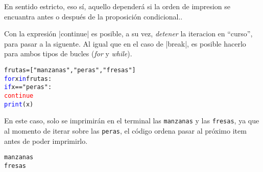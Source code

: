 \documentclass{article}
\begin{document}
\begin{enumerate}
{  En sentido estricto, eso sí, aquello dependerá si la orden de impresion se encuantra antes o después de la proposición condicional.}.
\par \hspace{5pt} Con la expresión \rverb|continue| es posible, a su vez, \emph{detener} la iteracion en ``curso'', para pasar a la siguente. Al igual que en el caso de \rverb|break|, es posible hacerlo para ambos tipos de bucles (\emph{for} y \emph{while}).
\begin{tcolorbox}
\begin{alltt}
frutas = ["manzanas", "peras", "fresas"]
\textcolor{blue}{for} x \textcolor{blue}{in} frutas:
  \textcolor{blue}{if} x == "peras":
    \textcolor{red}{continue}
  \textcolor{blue}{print}(x) 
\end{alltt}        
\end{tcolorbox}
\par \hspace{5pt} En este caso, solo se imprimirán en el terminal las \verb|manzanas| y las \verb|fresas|, ya que al momento de iterar sobre las \verb|peras|, el código ordena pasar al próximo item antes de poder imprimirlo. 
\begin{tcolorbox}
\begin{alltt}
manzanas
fresas 
\end{alltt}        
\end{tcolorbox}
\vspace{0.5cm}


\end{enumerate}
\end{document}
